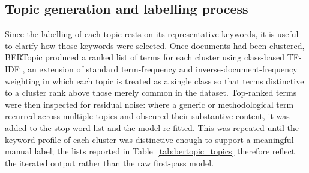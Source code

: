 \documentclass[12pt,a4paper]{report}
\begin{document}
\subsection{Topic generation and labelling process}
Since the labelling of each topic rests on its representative keywords, it is useful to clarify how those keywords were selected. Once documents had been clustered, BERTopic produced a ranked list of terms for each cluster using class-based TF-IDF \cite{grootendorst_2022_bertopic}, an extension of standard term-frequency and inverse-document-frequency weighting \cite{sparck_jones_1972_tfidf,salton_buckley_1988_termweighting} in which each topic is treated as a single class so that terms distinctive to a cluster rank above those merely common in the dataset. Top-ranked terms were then inspected for residual noise: where a generic or methodological term recurred across multiple topics and obscured their substantive content, it was added to the stop-word list and the model re-fitted. This was repeated until the keyword profile of each cluster was distinctive enough to support a meaningful manual label; the lists reported in Table~\ref{tab:bertopic_topics} therefore reflect the iterated output rather than the raw first-pass model.
\end{document}
